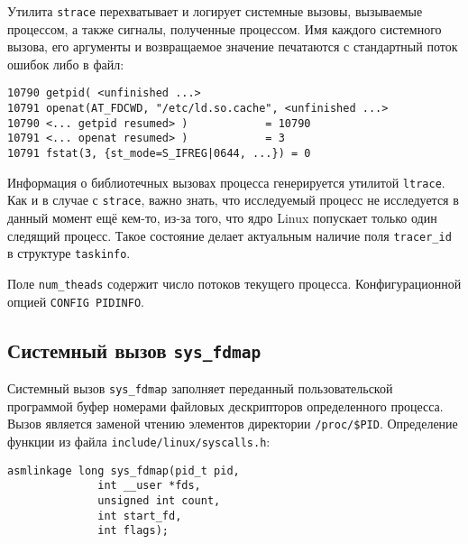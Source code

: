Утилита \texttt{strace} перехватывает и логирует системные вызовы, вызываемые
процессом, а также сигналы, полученные процессом. Имя каждого системного вызова,
его аргументы и возвращаемое значение печатаются с стандартный поток ошибок либо
в файл:

\medskip
\begin{lstlisting}[style=cstyle]
10790 getpid( <unfinished ...>
10791 openat(AT_FDCWD, "/etc/ld.so.cache", <unfinished ...>
10790 <... getpid resumed> )            = 10790
10791 <... openat resumed> )            = 3
10791 fstat(3, {st_mode=S_IFREG|0644, ...}) = 0
\end{lstlisting}
\medskip

Информация о библиотечных вызовах процесса генерируется утилитой
\texttt{ltrace}. Как и в случае с \texttt{strace}, важно знать, что исследуемый
процесс не исследуется в данный момент ещё кем-то, из-за того, что ядро Linux
попускает только один следящий процесс. Такое состояние делает актуальным
наличие поля \texttt{tracer\_id} в структуре \texttt{taskinfo}.

Поле \texttt{num\_theads} содержит число потоков текущего процесса.
Конфигурационной опцией \texttt{CONFIG\ PIDINFO}.

\subsection{Системный вызов \texttt{sys\_fdmap}}

Системный вызов \texttt{sys\_fdmap} заполняет переданный пользовательской
программой буфер номерами файловых дескрипторов определенного процесса. Вызов
является заменой чтению элементов директории \texttt{/proc/\$PID}. Определение
функции из файла \texttt{include/linux/syscalls.h}:

\medskip
\begin{lstlisting}[style=cstyle]
asmlinkage long sys_fdmap(pid_t pid,
			  int __user *fds,
			  unsigned int count,
			  int start_fd,
			  int flags);
\end{lstlisting}
\medskip

